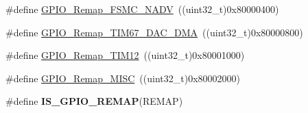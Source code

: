 \begin{DoxyCompactItemize}
\#define \hyperlink{group__GPIO__Remap__define_ga97088efda8b8a057f4ba58de8f51625f}{GPIO\_\-Remap\_\-FSMC\_\-NADV}~((uint32\_\-t)0x80000400)
\item 
\#define \hyperlink{group__GPIO__Remap__define_gae69d46a269c2284c8cc6a90742e89b12}{GPIO\_\-Remap\_\-TIM67\_\-DAC\_\-DMA}~((uint32\_\-t)0x80000800)
\item 
\#define \hyperlink{group__GPIO__Remap__define_ga44d3d86a684f62f9142d34ea5975a637}{GPIO\_\-Remap\_\-TIM12}~((uint32\_\-t)0x80001000)
\item 
\#define \hyperlink{group__GPIO__Remap__define_ga543f3626303b3452528cb622ad088d26}{GPIO\_\-Remap\_\-MISC}~((uint32\_\-t)0x80002000)
\item 
\#define {\bfseries IS\_\-GPIO\_\-REMAP}(REMAP)
\end{DoxyCompactItemize}


